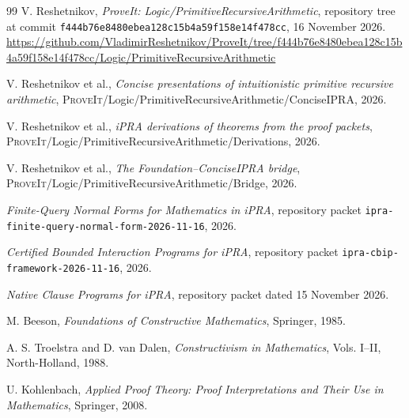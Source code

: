 \documentclass[11pt,oneside]{article}
\newcommand{\code}[1]{\texttt{#1}}
\newcommand{\repo}{\textsc{ProveIt}}
\begin{document}
\begin{sloppypar}
\begin{thebibliography}{99}
V. Reshetnikov, \emph{ProveIt: Logic/PrimitiveRecursiveArithmetic}, repository tree at commit
\code{f444b76e8480ebea128c15b4a59f158e14f478cc}, 16 November 2026.
\url{https://github.com/VladimirReshetnikov/ProveIt/tree/f444b76e8480ebea128c15b4a59f158e14f478cc/Logic/PrimitiveRecursiveArithmetic}

V. Reshetnikov et al., \emph{Concise presentations of intuitionistic primitive recursive arithmetic},
\repo/Logic/PrimitiveRecursiveArithmetic/ConciseIPRA, 2026.

V. Reshetnikov et al., \emph{iPRA derivations of theorems from the proof packets},
\repo/Logic/PrimitiveRecursiveArithmetic/Derivations, 2026.

V. Reshetnikov et al., \emph{The Foundation--ConciseIPRA bridge},
\repo/Logic/PrimitiveRecursiveArithmetic/Bridge, 2026.

\emph{Finite-Query Normal Forms for Mathematics in iPRA}, repository packet
\texttt{ipra-finite-query-normal-form-2026-11-16}, 2026.

\emph{Certified Bounded Interaction Programs for iPRA}, repository packet
\texttt{ipra-cbip-framework-2026-11-16}, 2026.

\emph{Native Clause Programs for iPRA}, repository packet dated 15 November 2026.

M. Beeson, \emph{Foundations of Constructive Mathematics}, Springer, 1985.

A. S. Troelstra and D. van Dalen, \emph{Constructivism in Mathematics}, Vols. I--II,
North-Holland, 1988.

U. Kohlenbach, \emph{Applied Proof Theory: Proof Interpretations and Their Use in Mathematics},
Springer, 2008.
\end{thebibliography}
\end{sloppypar}
\end{document}
